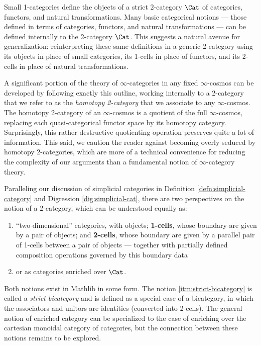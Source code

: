 Small 1-categories define the objects of a strict 2-category $\Cat$ of categories, functors, and natural transformations. Many basic categorical notions --- those defined in terms of categories, functors, and natural transformations --- can be defined internally to the 2-category $\Cat$. This suggests a natural avenue for generalization: reinterpreting these same definitions in a generic 2-category using its objects in place of small categories, its 1-cells in place of functors, and its 2-cells in place of natural transformations.

A significant portion of the theory of $\infty$-cat\-e\-go\-ries in any fixed $\infty$-cosmos can be developed by following exactly this outline, working internally to a 2-category that we refer to as the \emph{homotopy 2-category} that we associate to any $\infty$-cosmos. The homotopy 2-category of an $\infty$-cosmos is a quotient of the full $\infty$-cosmos, replacing each quasi-categorical functor space by its homotopy category. Surprisingly, this rather destructive quotienting operation preserves quite a lot of information.  This said, we caution the reader against becoming overly seduced by homotopy 2-categories, which are more of a technical convenience for reducing the complexity of our arguments than a fundamental notion of $\infty$-category theory.

Paralleling our discussion of simplicial categories in Definition \ref{defn:simplicial-category} and Digression \ref{dig:simplicial-cat}, there are two perspectives on the notion of a 2-category, which can be understood equally as:
\begin{enumerate}
\item\label{itm:strict-bicategory}  ``two-dimensional'' categories, with objects; \textbf{1-cells}, whose boundary are given by a pair of objects; and \textbf{2-cells}, whose boundary are given by a parallel pair of 1-cells between a pair of objects --- together with partially defined composition operations governed by this boundary data
\item or as categories enriched over $\Cat$.
\end{enumerate}

Both notions exist in Mathlib in some form. The notion \ref{itm:strict-bicategory} is called a \emph{strict bicategory} and is defined as a special case of a bicategory, in which the associators and unitors are identities (converted into 2-cells). The general notion of enriched category can be specialized to the case of enriching over the cartesian monoidal category of categories, but the connection between these notions remains to be explored.

